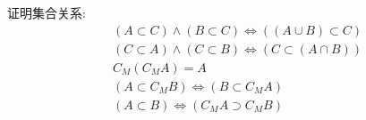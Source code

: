 

\begin{exercise}
\label{ex:b1-c1-s2-q1}
证明集合关系:\\
\begin{align*}
&(A\subset C)\land (B\subset C)\Leftrightarrow ((A\cup B)\subset C)\\
&(C\subset A)\land (C\subset B)\Leftrightarrow (C\subset (A\cap B))\\
&C_M(C_M A)=A\\
&(A\subset C_M B)\Leftrightarrow (B\subset C_M A)\\
&(A\subset B)\Leftrightarrow (C_M A\supset C_M B)
\end{align*}
\end{exercise}

